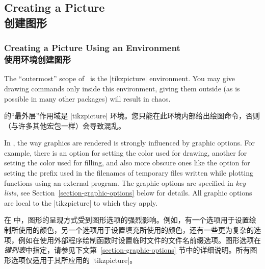 \subsection{Creating a Picture\\创建图形}

\subsubsection{Creating a Picture Using an Environment\\使用环境创建图形}

The ``outermost'' scope of \tikzname\ is the |{tikzpicture}| environment. You
may give drawing commands only inside this environment, giving them outside (as
is possible in many other packages) will result in chaos.

\tikzname 的“最外层”作用域是 |{tikzpicture}| 环境。您只能在此环境内部给出绘图命令，否则（与许多其他宏包一样）会导致混乱。

In \tikzname, the way graphics are rendered is strongly influenced by graphic
options. For example, there is an option for setting the color used for
drawing, another for setting the color used for filling, and also more obscure
ones like the option  for setting the prefix used in the filenames of temporary
files written while plotting functions using an external program. The graphic
options are specified in \emph{key lists}, see
Section~\ref{section-graphic-options} below for details. All graphic options
are local to the |{tikzpicture}| to which they apply.

在 \tikzname 中，图形的呈现方式受到图形选项的强烈影响。例如，有一个选项用于设置绘制所使用的颜色，另一个选项用于设置填充所使用的颜色，还有一些更为复杂的选项，例如在使用外部程序绘制函数时设置临时文件的文件名前缀选项。图形选项在\emph{键列表}中指定，请参见下文第~\ref{section-graphic-options} 节中的详细说明。所有图形选项仅适用于其所应用的 |{tikzpicture}|。

